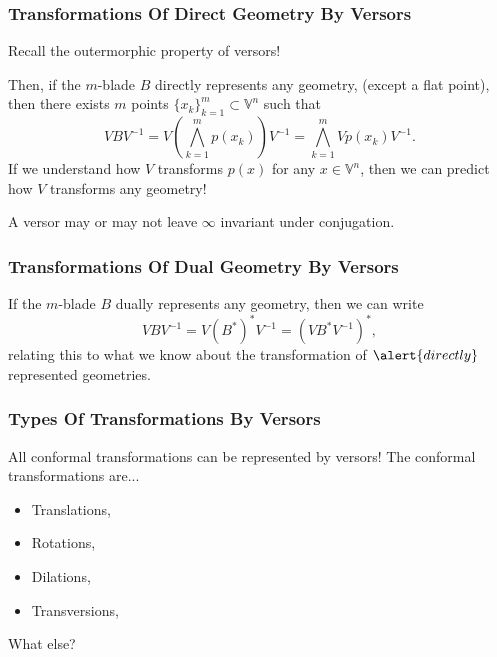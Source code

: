 \documentclass{beamer}
\newcommand{\V}{\mathbb{V}}
\newcommand{\nvai}{\infty}
\begin{document}
\begin{frame}
\frametitle{Transformations Of \alert{Direct} Geometry By Versors}
Recall the \alert{outermorphic} property of versors!

Then, if the $m$-blade $B$ \alert{directly} represents
any geometry, (\alert{except a flat point}), then there exists $m$
points $\{x_k\}_{k=1}^m\subset\V^n$ such that
\begin{equation*}
VBV^{-1} = V\left(\bigwedge_{k=1}^m p(x_k)\right)V^{-1} = \bigwedge_{k=1}^m Vp(x_k)V^{-1}.
\end{equation*}
If we understand how $V$ transforms $p(x)$ for any $x\in\V^n$, then we can
predict how $V$ transforms any geometry!

A versor may or may not leave $\nvai$ invariant under conjugation.
\end{frame}

\begin{frame}
\frametitle{Transformations Of \alert{Dual} Geometry By Versors}
If the $m$-blade $B$ \alert{dually} represents any geometry, then we can write
\begin{equation*}
VBV^{-1} = V(B^*)^*V^{-1} = (VB^*V^{-1})^*,
\end{equation*}
relating this to what we know about the transformation of $\alert{directly}$ represented geometries.
\end{frame}

\begin{frame}
\frametitle{Types Of Transformations By Versors}
All conformal transformations can be represented by versors!
The conformal transformations are...
\begin{itemize}
\item Translations,
\item Rotations,
\item Dilations,
\item Transversions,
\end{itemize}
What else?
\end{frame}
\end{document}
